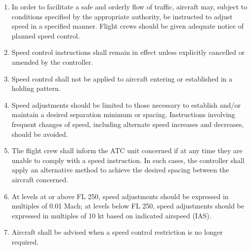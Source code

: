 \documentclass[../vATM.tex]{subfiles}
\begin{document}
    \begin{enumerate}
        \item In order to facilitate a safe and orderly flow of traffic, aircraft may, subject to conditions specified by the appropriate authority, be instructed to adjust speed in a specified manner. Flight crews should be given adequate notice of planned speed control.



        \item Speed control instructions shall remain in effect unless explicitly cancelled or amended by the controller.


        \item Speed control shall not be applied to aircraft entering or established in a holding pattern.
        \item Speed adjustments should be limited to those necessary to establish and/or maintain a desired separation minimum or spacing. Instructions involving frequent changes of speed, including alternate speed increases and decreases, should be avoided.
        \item The flight crew shall inform the ATC unit concerned if at any time they are unable to comply with a speed instruction. In such cases, the controller shall apply an alternative method to achieve the desired spacing between the aircraft concerned.
        \item At levels at or above FL 250, speed adjustments should be expressed in multiples of 0.01 Mach; at levels below FL 250, speed adjustments should be expressed in multiples of 10 kt based on indicated airspeed (IAS).



        \item Aircraft shall be advised when a speed control restriction is no longer required.
    \end{enumerate}
\end{document}
